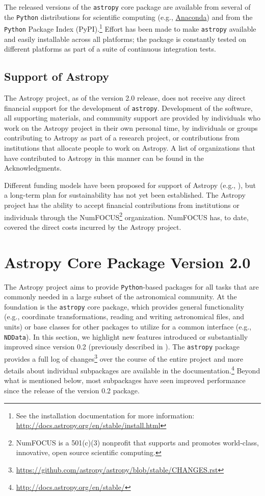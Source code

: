 \documentclass[modern]{aastex62}
\newcommand{\package}[1]{\texttt{#1}\xspace}
\newcommand{\python}{\package{Python}}
\newcommand{\astropy}{Astropy\xspace}
\newcommand{\astropypkg}{\package{astropy}}
\begin{document}
The released versions of the \astropypkg core package are available from several
of the \python distributions for scientific computing (e.g.,
\href{http://anaconda.org}{Anaconda}) and from the \python Package Index
(PyPI).\footnote{See the installation documentation for more information:
\url{http://docs.astropy.org/en/stable/install.html}}
Effort has been made to make \astropypkg available and easily installable across
all platforms; the package is constantly tested on different platforms as part
of a suite of continuous integration tests.

\subsection{Support of Astropy}

The \astropy project, as of the version 2.0 release, does not receive any direct
financial support for the development of \astropypkg.
Development of the software, all supporting materials, and community support are
provided by individuals who work on the \astropy project in their own personal
time, by individuals or groups contributing to \astropy as part of a research
project, or contributions from institutions that allocate people to work on
\astropy.
A list of organizations that have contributed to \astropy in this manner
can be found in the Acknowledgments.

Different funding models have been proposed for support of \astropy
(e.g., \citealt{2016arXiv161003159M}), but a long-term plan
for sustainability has not yet been established.
The \astropy project has the ability to accept financial contributions
from institutions or individuals through the NumFOCUS\footnote{NumFOCUS
is a 501(c)(3) nonprofit that supports and promotes world-class, innovative,
open source scientific computing.} organization. NumFOCUS has, to date, covered the direct costs incurred by the \astropy project.

\section{Astropy Core Package Version 2.0}
\label{sec:core}
The \astropy project aims to provide \python-based packages for all tasks that
are commonly needed in a large subset of the astronomical community.
At the foundation is the \astropypkg core package, which provides general
functionality (e.g., coordinate transformations, reading and writing
astronomical files, and units) or base classes for other
packages to utilize for a common interface (e.g., \texttt{NDData}).
In this section, we highlight new features introduced or substantially improved
since version 0.2 (previously described in \citealt{astropy}).  The \astropypkg
package
provides a full log of changes\footnote{\url{https://github.com/astropy/astropy/blob/stable/CHANGES.rst}}
over the course of the entire project and more details about individual
subpackages are available in the documentation.\footnote{\url{http://docs.astropy.org/en/stable/}}
Beyond what is mentioned below, most subpackages have seen improved performance
since the release of the version 0.2 package.
\end{document}

